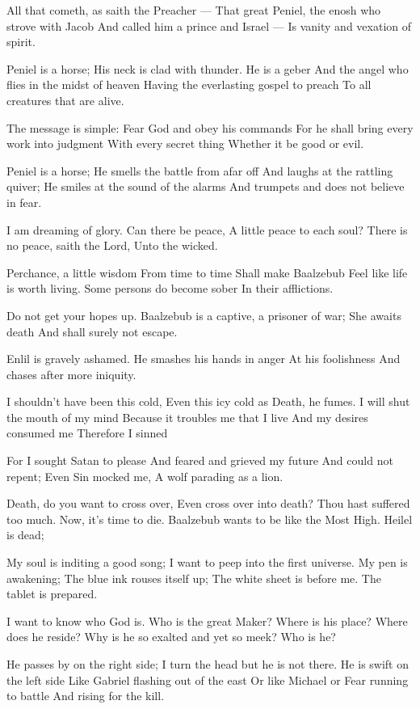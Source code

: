 \documentclass[
]{book}
\begin{document}
All that cometh, as saith the Preacher ---
That great Peniel, the enosh who strove with Jacob
And called him a prince and Israel ---
Is vanity and vexation of spirit.

Peniel is a horse;
His neck is clad with thunder.
He is a geber
And the angel who flies in the midst of heaven
Having the everlasting gospel to preach
To all creatures that are alive.

The message is simple:
Fear God and obey his commands
For he shall bring every work into judgment
With every secret thing
Whether it be good or evil.

Peniel is a horse;
He smells the battle from afar off
And laughs at the rattling quiver;
He smiles at the sound of the alarms
And trumpets and does not believe in fear.

I am dreaming of glory.
Can there be peace,
A little peace to each soul?
There is no peace, saith the Lord,
Unto the wicked.

Perchance, a little wisdom
From time to time
Shall make Baalzebub
Feel like life is worth living.
Some persons do become sober
In their afflictions.

Do not get your hopes up.
Baalzebub is a captive, a prisoner of war;
She awaits death
And shall surely not escape.

Enlil is gravely ashamed.
He smashes his hands in anger
At his foolishness
And chases after more iniquity.

I shouldn't have been this cold,
Even this icy cold as Death, he fumes.
I will shut the mouth of my mind
Because it troubles me that I live
And my desires consumed me
Therefore I sinned

For I sought Satan to please
And feared and grieved my future
And could not repent;
Even Sin mocked me,
A wolf parading as a lion.

Death, do you want to cross over,
Even cross over into death?
Thou hast suffered too much.
Now, it's time to die.
Baalzebub wants to be like the Most High.
Heilel is dead;

My soul is inditing a good song;
I want to peep into the first universe.
My pen is awakening;
The blue ink rouses itself up;
The white sheet is before me.
The tablet is prepared.

I want to know who God is.
Who is the great Maker?
Where is his place?
Where does he reside?
Why is he so exalted and yet so meek?
Who is he?

He passes by on the right side;
I turn the head but he is not there.
He is swift on the left side
Like Gabriel flashing out of the east
Or like Michael or Fear running to battle
And rising for the kill.
\end{document}
